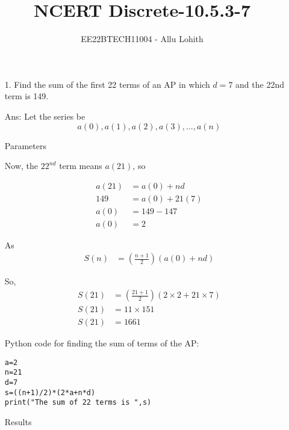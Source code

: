 \documentclass[journal,12pt,twocolumn]{IEEEtran}
\theoremstyle{remark}
\begin{document}

\vspace{3cm}

\title{NCERT Discrete-10.5.3-7}
\author{EE22BTECH11004 - Allu Lohith}

\maketitle
\newpage
\bigskip

\renewcommand{\thefigure}{\theenumi}
\renewcommand{\thetable}{\theenumi}
\begin{enumerate}
\item[1.]
Find the sum of the first 22 terms of an AP in which $d = 7$ and the 22nd term is 149.
\item[Ans:]
Let the series be $$a(0),a(1),a(2),a(3),\ldots,a(n)$$

\begin{table}[h!]
\centering

\vspace{0.5cm}
\caption{\normalsize Parameters}
\end{table}

Now, the $22^{nd}$ term means $a(21)$, so

\begin{align}
a(21) &= a(0)+nd\\
149 &= a(0)+21(7)\\
a(0) &= 149-147\\
a(0) &= 2    
\end{align}

As
\begin{align}
S(n) &= \left(\frac{n+1}{2}\right) (a(0)+nd)    
\end{align}

So, 
\begin{align}
S(21)&=\left(\frac{21+1}{2}\right)(2\times2+21\times7)\\
S(21)&=11\times151\\
S(21)&=1661
\end{align}

Python code for finding the sum of terms of the AP:
\begin{lstlisting}
a=2
n=21
d=7
s=((n+1)/2)*(2*a+n*d)
print("The sum of 22 terms is ",s)
\end{lstlisting}

\begin{table}[h!]
\centering

\vspace{0.5cm}
\caption{\normalsize Results}
\end{table}


\end{enumerate}
\end{document}

